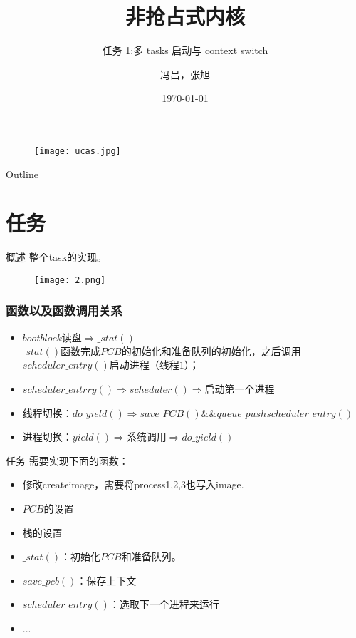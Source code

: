 \documentclass{beamer}
\title{非抢占式内核}
\subtitle{任务 1:多 tasks 启动与 context switch}
\institute{University of Chinese Academy of Sciences}
\author{冯吕，张旭}
\date{\today}
\begin{document}
\begin{frame}
\titlepage
\begin{figure}[ht]\centering\texttt{[image: ucas.jpg]}\end{figure}
\end{frame}

\begin{frame}{Outline}
\tableofcontents
\end{frame}
 
\section{任务}
\begin{frame}{概述}
整个task的实现。
\begin{figure}
	\texttt{[image: 2.png]}
\end{figure}
\end{frame}
\begin{frame}
\frametitle{函数以及函数调用关系}
\begin{itemize}
	\item $bootblock\text{读盘}\Rightarrow \_stat()$\\
	$\_stat()$函数完成$PCB$的初始化和准备队列的初始化，之后调用$scheduler\_entry()$启动进程（线程$1$）；\\
	
	\item $scheduler\_entrry()\Rightarrow scheduler()\Rightarrow$启动第一个进程\\
	\item 线程切换：$do\_yield()\Rightarrow save\_PCB() \&\& queue\_push 
	scheduler\_entry()$\\
	\item 进程切换：$yield()\Rightarrow \text{系统调用}\Rightarrow do\_yield()$
\end{itemize}
\end{frame}

\begin{frame}{任务}
需要实现下面的函数：
\begin{itemize}
	\item 修改createimage，需要将process1,2,3也写入image.
	\item $PCB$的设置
	\item 栈的设置
	\item $\_stat()$：初始化$PCB$和准备队列。
	\item $save\_pcb()$：保存上下文
	\item $scheduler\_entry()$：选取下一个进程来运行
	\item ...
\end{itemize}
\end{frame}
\end{document}
